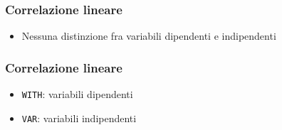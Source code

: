 






\begin{frame}[containsverbatim]\frametitle{Correlazione lineare}
  \begin{itemize}
  \item
    Nessuna distinzione fra variabili dipendenti e indipendenti
  \end{itemize}
\end{frame}


\begin{frame}[containsverbatim]\frametitle{Correlazione lineare}
  \begin{itemize}
  \item
    \verb!WITH!: variabili dipendenti
  \item
    \verb!VAR!: variabili indipendenti
  \end{itemize}
\end{frame}


